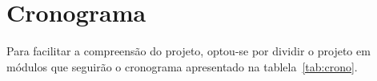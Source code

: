 \chapter{Cronograma}\label{cap:cronograma}

Para facilitar a compreensão do projeto, optou-se por dividir o projeto em módulos
que seguirão o cronograma apresentado na tablela~\ref{tab:crono}.

\begin{table}[ht]
\caption{Cronograma --- {\footnotesize MMP: Modelagem do mapeamento; PVC: Prova de conceito;
IMPARQ: Implementação da arquitetura; IMPALG: Implementação do Algoritmo; RED: Redação do
texto; TST: Testes; DEF: Defesa}\label{tab:crono}}
\end{table}

